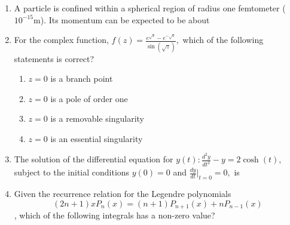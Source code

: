 \documentclass[journal,12pt,onecolumn]{IEEEtran}
\theoremstyle{remark}
\begin{document}
\begin{enumerate}
\item A particle is confined within a spherical region of radius one femtometer ($10^{-15}$m). Its momentum can be expected to be about\hfill{}

\begin{enumerate}  \end{enumerate}


\item For the complex function, $f(z)=\frac{e^{\sqrt{z}}-e^{-\sqrt{z}}}{\sin(\sqrt{z})},$ which of the following statements is correct?\hfill{}

\begin{enumerate}
	\item $z=0$ is a branch point \item $z=0$ is a pole of order one
	\item $z=0$ is a removable singularity \item $z=0$ is an essential singularity
\end{enumerate}

\item The solution of the differential equation for $y(t): \frac{d^{2}y}{dt^{2}}-y=2\cosh(t)$, subject to the initial conditions $y(0)=0$ and $\frac{dy}{dt}|_{t=0}=0,$ is\hfill{}

\begin{enumerate}
	\begin{multicols}{2}
	 \item $\frac{1}{2}\cosh(t)+t\sinh(t)$ \item $-\sinh(t)+t\cosh(t)$
	\item $t\cosh(t)$ \item $t\sinh(t)$
	\end{multicols}
\end{enumerate}

\item Given the recurrence relation for the Legendre polynomials $$(2n+1) x P_n(x)=(n+1) P_{n+1}(x)+nP_{n-1}(x)$$, which of the following integrals has a non-zero value?\hfill{}


\end{enumerate}
\end{document}
